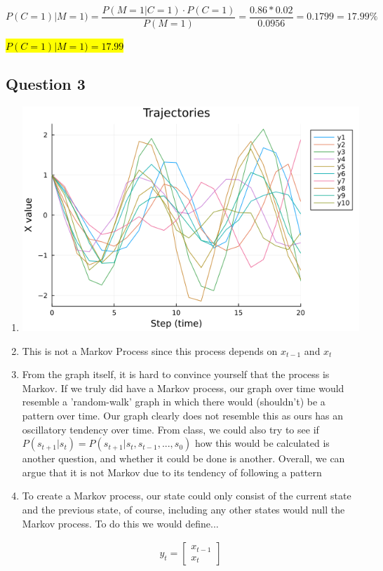 \documentclass[conf]{new-aiaa}
\begin{document}
\[P(C = 1)|M = 1) = \frac{P(M = 1|C = 1) \cdot P(C = 1)}{P(M = 1)} = \frac{0.86 * 0.02}{0.0956} = 0.1799 = 17.99\%\]

\begin{center}
    \hl{$P(C = 1)|M = 1) = 17.99$}
\end{center}

\subsection{Question 3}
\begin{enumerate}[label = \alph*)]
\item \includegraphics[scale = 0.60]{HW3Num3.png}
\item This is not a Markov Process since this process depends on $x_{t-1}$ and $x_t$
\item From the graph itself, it is hard to convince yourself that the process is Markov. If we truly did have a Markov process, our graph over time would resemble a 'random-walk' graph in which there would (shouldn't) be a pattern over time. Our graph clearly does not resemble this as ours has an oscillatory tendency over time. From class, we could also try to see if $P(s_{t+1}|s_t) = P(s_{t+1}|s_t , s_{t-1} , ..., s_0)$ how this would be calculated is another question, and whether it could be done is another. Overall, we can argue that it is not Markov due to its tendency of following a pattern
\item To create a Markov process, our state could only consist of the current state and the previous state, of course, including any other states would null the Markov process. To do this we would define...

\begin{gather}
    y_t
    =
    \begin{bmatrix}
        x_{t-1}\\
        x_{t}
    \end{bmatrix}
\end{gather}



\end{enumerate}
\end{document}
